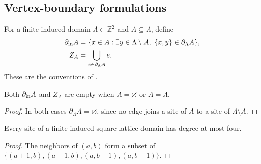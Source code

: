 \subsection{Vertex-boundary formulations}
\label{sec:area_law_vertex_boundaries}

\begin{definition}
    \label{def:area_law_vertex_boundaries}
    \leanok
    For a finite induced domain $\Lambda\subset\mathbb Z^2$ and $A\subseteq\Lambda$,
    define
    \begin{align}
        \partial_{\rm in}A
            & =\{x\in A:\exists y\in\Lambda\setminus A,
        \ \{x,y\}\in\partial_\Lambda A\},
        \label{eq:area_vertex_inner}                    \\
        Z_A & =\bigcup_{e\in\partial_\Lambda A}e.
        \label{eq:area_vertex_endpoints}
    \end{align}
    These are the conventions of \cite[Corollary~1.2]{OpenAI2026AreaLaw}.
\end{definition}

\begin{lemma}
    \label{thm:area_law_vertex_boundaries_trivial}
    \leanok
    Both $\partial_{\rm in}A$ and $Z_A$ are empty when $A=\varnothing$ or
    $A=\Lambda$.
\end{lemma}
\begin{proof}\leanok
    In both cases $\partial_\Lambda A=\varnothing$, since no edge joins a site of
    $A$ to a site of $\Lambda\setminus A$.
\end{proof}

\begin{lemma}
    \label{thm:area_law_lattice_degree}
    \leanok
    Every site of a finite induced square-lattice domain has degree at most four.
\end{lemma}
\begin{proof}\leanok
    The neighbors of $(a,b)$ form a subset of
    $\{(a+1,b),(a-1,b),(a,b+1),(a,b-1)\}$.
\end{proof}

